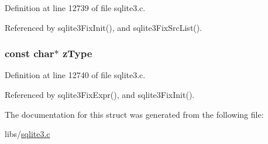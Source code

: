 Definition at line 12739 of file sqlite3.\+c.



Referenced by sqlite3\+Fix\+Init(), and sqlite3\+Fix\+Src\+List().

\hypertarget{struct_db_fixer_ae215e2599893c4ca8ed6670cbf1608cf}{}
\subsubsection[{z\+Type}]{\setlength{\rightskip}{0pt plus 5cm}const char$\ast$ z\+Type}\label{struct_db_fixer_ae215e2599893c4ca8ed6670cbf1608cf}


Definition at line 12740 of file sqlite3.\+c.



Referenced by sqlite3\+Fix\+Expr(), and sqlite3\+Fix\+Init().



The documentation for this struct was generated from the following file\+:\begin{DoxyCompactItemize}
\item 
libs/\hyperlink{sqlite3_8c}{sqlite3.\+c}\end{DoxyCompactItemize}
